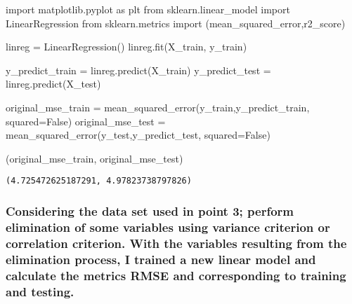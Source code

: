 \documentclass[
  letterpaper,
  DIV=11,
  numbers=noendperiod]{scrartcl}
\newenvironment{Shaded}{\begin{snugshade}}{\end{snugshade}}
\newcommand{\ImportTok}[1]{\textcolor[rgb]{0.00,0.46,0.62}{#1}}
\newcommand{\NormalTok}[1]{\textcolor[rgb]{0.00,0.23,0.31}{#1}}
\newcommand{\OperatorTok}[1]{\textcolor[rgb]{0.37,0.37,0.37}{#1}}
\newcommand{\VariableTok}[1]{\textcolor[rgb]{0.07,0.07,0.07}{#1}}
\begin{document}
\begin{Shaded}
\begin{Highlighting}[]
\ImportTok{import}\NormalTok{ matplotlib.pyplot }\ImportTok{as}\NormalTok{ plt}
\ImportTok{from}\NormalTok{ sklearn.linear\_model }\ImportTok{import}\NormalTok{ LinearRegression}
\ImportTok{from}\NormalTok{ sklearn.metrics }\ImportTok{import}\NormalTok{ (mean\_squared\_error,r2\_score)}

\NormalTok{linreg }\OperatorTok{=}\NormalTok{ LinearRegression()}
\NormalTok{linreg.fit(X\_train, y\_train)}

\NormalTok{y\_predict\_train }\OperatorTok{=}\NormalTok{ linreg.predict(X\_train)}
\NormalTok{y\_predict\_test }\OperatorTok{=}\NormalTok{ linreg.predict(X\_test)}

\NormalTok{original\_mse\_train }\OperatorTok{=}\NormalTok{ mean\_squared\_error(y\_train,y\_predict\_train, squared}\OperatorTok{=}\VariableTok{False}\NormalTok{)}
\NormalTok{original\_mse\_test }\OperatorTok{=}\NormalTok{ mean\_squared\_error(y\_test,y\_predict\_test, squared}\OperatorTok{=}\VariableTok{False}\NormalTok{)}

\NormalTok{(original\_mse\_train, original\_mse\_test)}
\end{Highlighting}
\end{Shaded}

\begin{verbatim}
(4.725472625187291, 4.97823738797826)
\end{verbatim}

\hypertarget{considering-the-data-set-used-in-point-3-perform-elimination-of-some-variables-using-variance-criterion-or-correlation-criterion.-with-the-variables-resulting-from-the-elimination-process-i-trained-a-new-linear-model-and-calculate-the-metrics-rmse-and-corresponding-to-training-and-testing.}{%
\subsubsection{Considering the data set used in point 3; perform
elimination of some variables using variance criterion or correlation
criterion. With the variables resulting from the elimination process, I
trained a new linear model and calculate the metrics RMSE and
corresponding to training and
testing.}\label{considering-the-data-set-used-in-point-3-perform-elimination-of-some-variables-using-variance-criterion-or-correlation-criterion.-with-the-variables-resulting-from-the-elimination-process-i-trained-a-new-linear-model-and-calculate-the-metrics-rmse-and-corresponding-to-training-and-testing.}}
\end{document}

